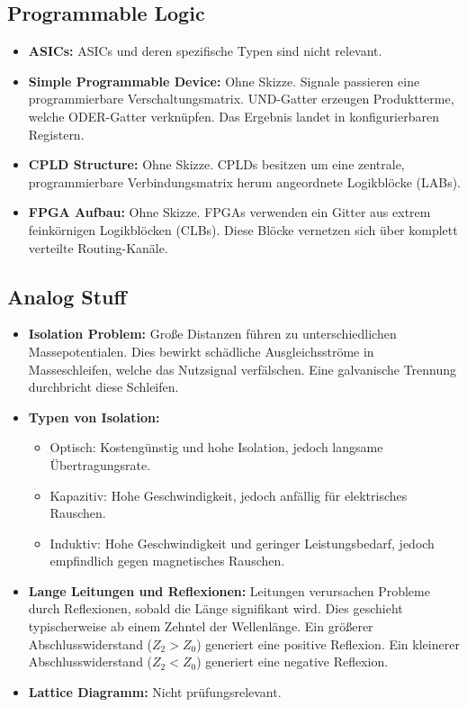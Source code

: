\documentclass[11pt,a4paper]{article}
\begin{document}
\subsection{Programmable Logic}
\begin{itemize}
    \item \textbf{ASICs:} ASICs und deren spezifische Typen sind nicht relevant.
    \item \textbf{Simple Programmable Device:} Ohne Skizze. Signale passieren eine programmierbare Verschaltungsmatrix. UND-Gatter erzeugen Produktterme, welche ODER-Gatter verknüpfen. Das Ergebnis landet in konfigurierbaren Registern.
    \item \textbf{CPLD Structure:} Ohne Skizze. CPLDs besitzen um eine zentrale, programmierbare Verbindungsmatrix herum angeordnete Logikblöcke (LABs).
    \item \textbf{FPGA Aufbau:} Ohne Skizze. FPGAs verwenden ein Gitter aus extrem feinkörnigen Logikblöcken (CLBs). Diese Blöcke vernetzen sich über komplett verteilte Routing-Kanäle.
\end{itemize}

\subsection{Analog Stuff}
\begin{itemize}
    \item \textbf{Isolation Problem:} Große Distanzen führen zu unterschiedlichen Massepotentialen. Dies bewirkt schädliche Ausgleichsströme in Masseschleifen, welche das Nutzsignal verfälschen. Eine galvanische Trennung durchbricht diese Schleifen.
    \item \textbf{Typen von Isolation:}
    \begin{itemize}
        \item Optisch: Kostengünstig und hohe Isolation, jedoch langsame Übertragungsrate.
        \item Kapazitiv: Hohe Geschwindigkeit, jedoch anfällig für elektrisches Rauschen.
        \item Induktiv: Hohe Geschwindigkeit und geringer Leistungsbedarf, jedoch empfindlich gegen magnetisches Rauschen.
    \end{itemize}
    \item \textbf{Lange Leitungen und Reflexionen:} Leitungen verursachen Probleme durch Reflexionen, sobald die Länge signifikant wird. Dies geschieht typischerweise ab einem Zehntel der Wellenlänge. Ein größerer Abschlusswiderstand ($Z_2 > Z_0$) generiert eine positive Reflexion. Ein kleinerer Abschlusswiderstand ($Z_2 < Z_0$) generiert eine negative Reflexion.
    \item \textbf{Lattice Diagramm:} Nicht prüfungsrelevant.
\end{itemize}
\end{document}
